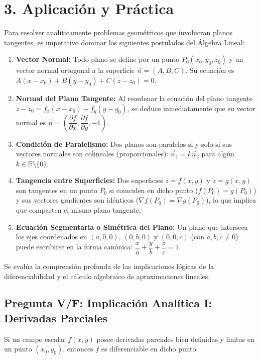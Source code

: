 \documentclass[11pt]{article}
\newenvironment{repaso}[1]{%
  \begin{tcolorbox}[colback=orange!5,colframe=orange!80!black,title=Recordatorio de Álgebra Lineal: #1]%
}{%
  \end{tcolorbox}%
}
\newenvironment{aplicacion}{%
  \section*{3. Aplicación y Práctica}%
}{}
\newenvironment{preguntaverdaderofalso}[1]{\subsection*{Pregunta V/F: #1}\par\vspace{0.1cm}}{\vspace{0.3cm}}
\begin{document}
\begin{aplicacion}

  \begin{repaso}{Planos en $\mathbb{R}^3$}
    Para resolver analíticamente problemas geométricos que involucran planos tangentes, es imperativo dominar los siguientes postulados del Álgebra Lineal:
    \begin{enumerate}
      \item \textbf{Vector Normal:} Todo plano se define por un punto $P_0(x_0, y_0, z_0)$ y un vector normal ortogonal a la superficie $\vec{n} = (A, B, C)$. Su ecuación es $A(x-x_0) + B(y-y_0) + C(z-z_0) = 0$.
      \item \textbf{Normal del Plano Tangente:} Al reordenar la ecuación del plano tangente $z - z_0 = f_x(x-x_0) + f_y(y-y_0)$, se deduce inmediatamente que su vector normal es $\vec{n} = \left( \dfrac{\partial f}{\partial x}, \dfrac{\partial f}{\partial y}, -1 \right)$.
      \item \textbf{Condición de Paralelismo:} Dos planos son paralelos si y solo si sus vectores normales son colineales (proporcionales): $\vec{n}_1 = k\vec{n}_2$ para algún $k \in \mathbb{R} \setminus \{0\}$.
      \item \textbf{Tangencia entre Superficies:} Dos superficies $z = f(x,y)$ y $z = g(x,y)$ son tangentes en un punto $P_0$ si coinciden en dicho punto ($f(P_0) = g(P_0)$) y sus vectores gradientes son idénticos ($\nabla f(P_0) = \nabla g(P_0)$), lo que implica que comparten el mismo plano tangente.
      \item \textbf{Ecuación Segmentaria o Simétrica del Plano:} Un plano que interseca los ejes coordenados en $(a,0,0)$, $(0,b,0)$ y $(0,0,c)$ (con $a,b,c \neq 0$) puede escribirse en la forma canónica: $\dfrac{x}{a} + \dfrac{y}{b} + \dfrac{z}{c} = 1$.
    \end{enumerate}
  \end{repaso}
  
  Se evalúa la comprensión profunda de las implicaciones lógicas de la diferenciabilidad y el cálculo algebraico de aproximaciones lineales.

  \begin{preguntaverdaderofalso}{Implicación Analítica I: Derivadas Parciales}
    Si un campo escalar $f(x,y)$ posee derivadas parciales bien definidas y finitas en un punto $(x_0,y_0)$, entonces $f$ es diferenciable en dicho punto.
    

\end{preguntaverdaderofalso}
\end{aplicacion}
\end{document}
